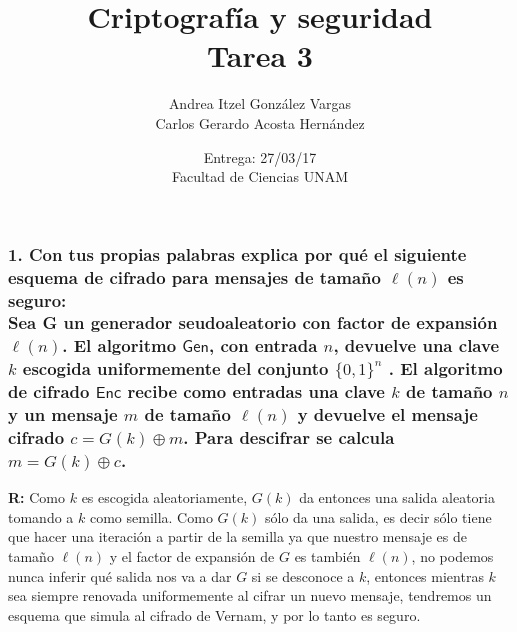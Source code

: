 \documentclass[12pt]{article}
\title{Criptografía y seguridad \\ Tarea 3}
\author{Andrea Itzel González Vargas \\ Carlos Gerardo Acosta Hernández}
\date{Entrega: 27/03/17 \\ Facultad de Ciencias UNAM}
\begin{document}
\maketitle
\subsubsection*{1. Con tus propias palabras explica por qué el siguiente esquema de cifrado para mensajes de tamaño $\ell(n)$ es seguro: \\
Sea G un generador seudoaleatorio con factor de expansión $\ell (n)$. El algoritmo $\textsf{Gen}$, con entrada $n$, devuelve una clave $k$ escogida uniformemente del conjunto $\{0, 1\}^n$ . El algoritmo de cifrado $\textsf{Enc}$ recibe como entradas una clave $k$ de tamaño $n$ y un mensaje $m$ de tamaño $\ell (n)$ y devuelve el mensaje cifrado $c = G(k) \oplus m$. Para descifrar se calcula $m = G(k) \oplus c$.}
 \textbf{R:} Como $k$ es escogida aleatoriamente, $G(k)$ da entonces una salida aleatoria tomando a $k$ como semilla. Como $G(k)$ sólo da una salida, es decir sólo tiene que hacer una iteración a partir de la semilla ya que nuestro mensaje es de tamaño $\ell(n)$ y el factor de expansión de $G$ es también $\ell(n)$, no podemos nunca inferir qué salida nos va a dar $G$ si se desconoce a $k$, entonces mientras $k$ sea siempre renovada uniformemente al cifrar un nuevo mensaje, tendremos un esquema que simula al cifrado de Vernam, y por lo tanto es seguro.
\end{document}
